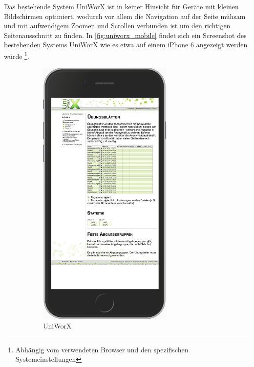 \documentclass[11pt,a4paper,twoside,ngerman]{article}
\begin{document}
Das bestehende System UniWorX ist in keiner Hinsicht für Geräte mit kleinen Bildschirmen optimiert, wodurch vor allem die Navigation auf der Seite mühsam und mit aufwendigem Zoomen und Scrollen verbunden ist um den richtigen Seitenausschnitt zu finden. In \autoref{fig:uniworx_mobile} findet sich ein Screenshot des bestehenden Systems UniWorX wie es etwa auf einem iPhone 6 angezeigt werden würde \footnote{Abhängig vom verwendeten Browser und den spezifischen Systemeinstellungen}.

\begin{figure}
    \centering
    \begin{subfigure}{.5\textwidth}
      \centering
      \includegraphics[width=67mm]{m_uniworx_sheets.jpg}
      \caption{UniWorX}
      \label{fig:sub1}
    \end{subfigure}%
    \begin{subfigure}{.5\textwidth}
      \centering

\end{subfigure}
\end{figure}
\end{document}

